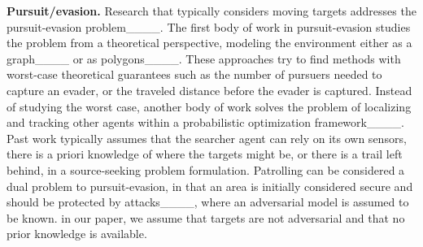 \textbf{Pursuit/evasion.} Research that typically considers moving targets addresses the pursuit-evasion problem____.
The first body of work in pursuit-evasion studies the problem from a theoretical perspective, modeling the environment either as a graph____ or as polygons____. These approaches try to find methods with worst-case theoretical guarantees  such as the number of pursuers needed to capture an evader, or the traveled distance before the evader is captured. Instead of studying the worst case, another body of work solves the problem of localizing and tracking other agents within a probabilistic optimization framework____. Past work typically assumes that the searcher agent can rely on its own sensors, there is  a priori knowledge of where the targets might be, or there is a trail left behind, in a source-seeking problem formulation. Patrolling can be considered a dual problem to pursuit-evasion, in that an area is initially considered secure and should be protected by attacks____, where an adversarial model is assumed to be known.  in our paper, we assume that targets are not adversarial and that no prior knowledge is available. 
%



